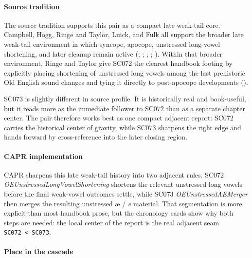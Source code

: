 \documentclass[
  british,
  a4paper,
]{article}
\begin{document}
\paragraph{Source tradition}\label{source-tradition-45}

The source tradition supports this pair as a compact late weak-tail
core. Campbell, Hogg, Ringe and Taylor, Luick, and Fulk all support the
broader late weak-tail environment in which syncope, apocope, unstressed
long-vowel shortening, and later cleanup remain active
(;
;
; ; ). Within that
broader environment, Ringe and Taylor give SC072 the clearest handbook
footing by explicitly placing shortening of unstressed long vowels among
the last prehistoric Old English sound changes and tying it directly to
post-apocope developments ().

SC073 is slightly different in source profile. It is historically real
and book-useful, but it reads more as the immediate follower to SC072
than as a separate chapter center. The pair therefore works best as one
compact adjacent report: SC072 carries the historical center of gravity,
while SC073 sharpens the right edge and hands forward by cross-reference
into the later closing region.

\paragraph{CAPR implementation}\label{capr-implementation-45}

CAPR sharpens this late weak-tail history into two adjacent rules. SC072
\emph{OEUnstressedLongVowelShortening} shortens the relevant unstressed
long vowels before the final weak-vowel outcomes settle, while SC073
\emph{OEUnstressedAEMerger} then merges the resulting unstressed æ /
\emph{e} material. That segmentation is more explicit than most handbook
prose, but the chronology cards show why both steps are needed: the
local center of the report is the real adjacent seam
\texttt{SC072\ \textless{}\ SC073}.

\paragraph{Place in the cascade}\label{place-in-the-cascade-45}
\end{document}
